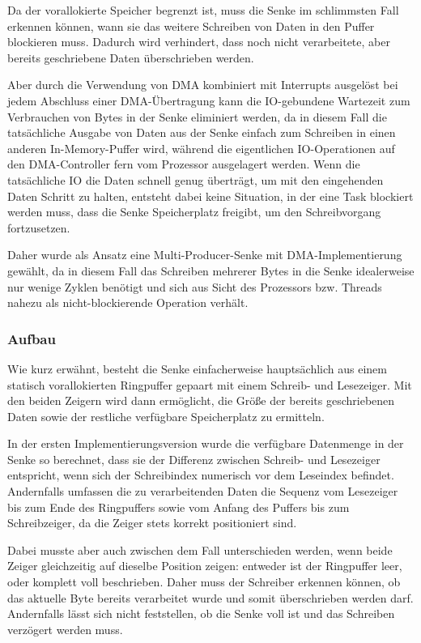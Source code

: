 Da der vorallokierte Speicher begrenzt ist, muss die Senke im schlimmsten Fall
erkennen können, wann sie das weitere Schreiben von Daten in den Puffer
blockieren muss. Dadurch wird verhindert, dass noch nicht verarbeitete, aber
bereits geschriebene Daten überschrieben werden.

Aber durch die Verwendung von DMA kombiniert mit Interrupts ausgelöst bei jedem
Abschluss einer DMA-Übertragung kann die IO-gebundene Wartezeit zum Verbrauchen
von Bytes in der Senke eliminiert werden, da in diesem Fall die tatsächliche
Ausgabe von Daten aus der Senke einfach zum Schreiben in einen anderen
In-Memory-Puffer wird, während die eigentlichen IO-Operationen auf den
DMA-Controller fern vom Prozessor ausgelagert werden. Wenn die tatsächliche IO
die Daten schnell genug überträgt, um mit den eingehenden Daten Schritt zu
halten, entsteht dabei keine Situation, in der eine Task blockiert werden muss,
dass die Senke Speicherplatz freigibt, um den Schreibvorgang fortzusetzen.

Daher wurde als Ansatz eine Multi-Producer-Senke mit DMA-Implementierung
gewählt, da in diesem Fall das Schreiben mehrerer Bytes in die Senke
idealerweise nur wenige Zyklen benötigt und sich aus Sicht des Prozessors bzw.
Threads nahezu als nicht-blockierende Operation verhält.

\subsubsection{Aufbau}

Wie kurz erwähnt, besteht die Senke einfacherweise hauptsächlich aus einem
statisch vorallokierten Ringpuffer gepaart mit einem Schreib- und Lesezeiger.
Mit den beiden Zeigern wird dann ermöglicht, die Größe der bereits geschriebenen
Daten sowie der restliche verfügbare Speicherplatz zu ermitteln.

In der ersten Implementierungsversion wurde die verfügbare Datenmenge in der
Senke so berechnet, dass sie der Differenz zwischen Schreib- und Lesezeiger
entspricht, wenn sich der Schreibindex numerisch vor dem Leseindex befindet.
Andernfalls umfassen die zu verarbeitenden Daten die Sequenz vom Lesezeiger bis
zum Ende des Ringpuffers sowie vom Anfang des Puffers bis zum Schreibzeiger, da
die Zeiger stets korrekt positioniert sind.

Dabei musste aber auch zwischen dem Fall unterschieden werden, wenn beide Zeiger
gleichzeitig auf dieselbe Position zeigen: entweder ist der Ringpuffer leer,
oder komplett voll beschrieben. Daher muss der Schreiber erkennen können, ob das
aktuelle Byte bereits verarbeitet wurde und somit überschrieben werden darf.
Andernfalls lässt sich nicht feststellen, ob die Senke voll ist und das
Schreiben verzögert werden muss.

